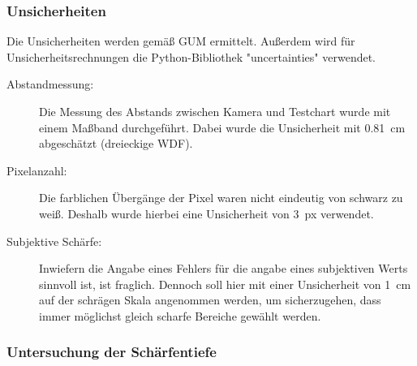 \documentclass[
	a4paper,
	12pt,
	pagesize,
	ngerman
]{scrartcl}
\begin{document}
	\subsubsection{Unsicherheiten} %
Die Unsicherheiten werden gemäß GUM ermittelt. 
	Außerdem wird für Unsicherheitsrechnungen die Python-Bibliothek "uncertainties" verwendet.
	\begin{description}
		\item[Abstandmessung:] Die Messung des Abstands zwischen Kamera und Testchart wurde mit einem Maßband durchgeführt. 
			Dabei wurde die Unsicherheit mit \SI{0,81}{cm} abgeschätzt (dreieckige WDF).
		\item[Pixelanzahl:] Die farblichen Übergänge der Pixel waren nicht eindeutig von schwarz zu weiß. 
			Deshalb wurde hierbei eine Unsicherheit von \SI{3}{px} verwendet.  %
		\item[Subjektive Schärfe:] Inwiefern die Angabe eines Fehlers für die angabe eines subjektiven Werts sinnvoll ist, ist fraglich. Dennoch soll hier mit einer Unsicherheit von \SI{1}{cm} auf der schrägen Skala angenommen werden, um sicherzugehen, dass immer möglichst gleich scharfe Bereiche gewählt werden.  %
	\end{description}

	\subsubsection{Untersuchung der Schärfentiefe}
\end{document}
